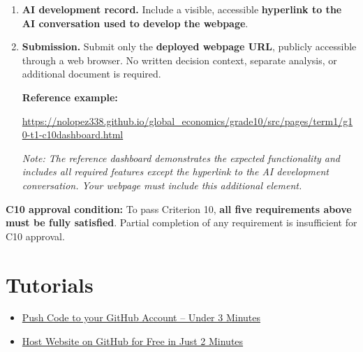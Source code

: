 \begin{enumerate}[label=\textbf{\arabic*.},leftmargin=*]
		\item \textbf{AI development record.}
		Include a visible, accessible \textbf{hyperlink to the AI conversation used to develop the webpage}.
		
		\item \textbf{Submission.}
		Submit only the \textbf{deployed webpage URL}, publicly accessible through a web browser. No written decision context, separate analysis, or additional document is required.
		
		\textbf{Reference example:}
		
		\begin{center}
			\url{https://nolopez338.github.io/global_economics/grade10/src/pages/term1/g10-t1-c10dashboard.html}
		\end{center}
		
		\textit{Note: The reference dashboard demonstrates the expected functionality and includes all required features except the hyperlink to the AI development conversation. Your webpage must include this additional element.}
		
	\end{enumerate}
	
	\medskip
	\noindent\textbf{C10 approval condition:}
	To pass Criterion 10, \textbf{all five requirements above must be fully satisfied}. Partial completion of any requirement is insufficient for C10 approval.
	
	\section*{Tutorials}
	\begin{itemize}
		\item \href{https://www.youtube.com/watch?v=vpRkAoCqX3o}{Push Code to your GitHub Account -- Under 3 Minutes}
		\item \href{https://www.youtube.com/watch?v=BT4WzyT2g8k&t=13s}{Host Website on GitHub for Free in Just 2 Minutes}
	\end{itemize}
	
